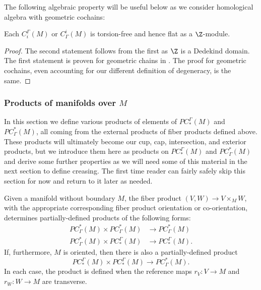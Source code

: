 The following algebraic property will be useful below as we consider homological algebra with geometric cochains:

\begin{lemma}
	Each $C_i^\Gamma(M)$ or $C_\Gamma^i(M)$ is torsion-free and hence flat as a $\Z$-module.
\end{lemma}

\begin{proof}
	The second statement follows from the first as $\Z$ is a Dedekind domain.
	The first statement is proven for geometric chains in \cite[Lemma 34]{Lipy14}.
	The proof for geometric cochains, even accounting for our different definition of degeneracy, is the same.
\end{proof}

\subsubsection{Products of manifolds over \texorpdfstring{$M$}{M}}

In this section we define various products of elements of $PC_*^\Gamma(M)$ and $PC^*_\Gamma(M)$, all coming from the external products of fiber products defined above.
These products will ultimately become our cup, cap, intersection, and exterior products, but we introduce them here as products on $PC_*^\Gamma(M)$ and $PC^*_\Gamma(M)$ and derive some further properties as we will need some of this material in the next section to define creasing.
The first time reader can fairly safely skip this section for now and return to it later as needed.

\begin{definition}\label{D: PC products}
	Given a manifold without boundary $M$, the fiber product $(V,W) \to V \times_M W$, with the appropriate corresponding fiber product orientation or co-orientation, determines partially-defined products of the following forms:
	\begin{align*}
		PC^*_\Gamma(M) \times PC^*_\Gamma(M)& \to PC^*_\Gamma(M)\\
		PC^*_\Gamma(M) \times PC_*^\Gamma(M)& \to PC_*^\Gamma(M).
	\end{align*}
	If, furthermore, $M$ is oriented, then there is also a partially-defined product
	$$PC_*^\Gamma(M) \times PC_*^\Gamma(M) \to PC^*_\Gamma(M).$$
	In each case, the product is defined when the reference maps $r_V \colon V \to M$ and $r_W \colon W \to M$ are transverse.
\end{definition}

